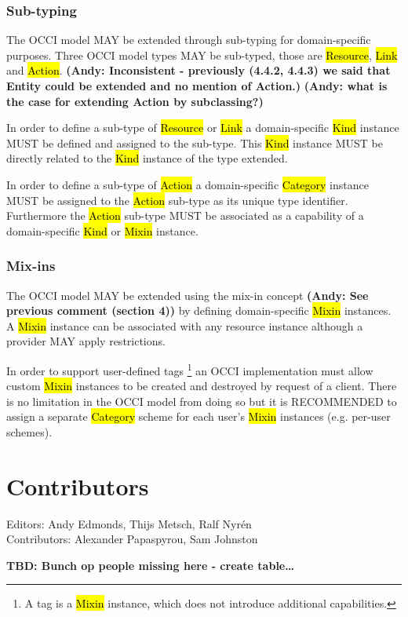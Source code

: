 \documentclass[10pt,a4paper]{article}
\begin{document}
\subsubsection{Sub-typing}
The OCCI model MAY be extended through sub-typing for domain-specific purposes.
Three OCCI model types MAY be sub-typed, those are \hl{Resource}, \hl{Link} and
\hl{Action}. \textbf{(Andy: Inconsistent - previously (4.4.2, 4.4.3) we said that Entity 
could be extended and no mention of Action.)} 
\textbf{(Andy: what is the case for extending Action by subclassing?)}

In order to define a sub-type of \hl{Resource} or \hl{Link} a domain-specific
\hl{Kind} instance MUST be defined and assigned to the sub-type. This
\hl{Kind} instance MUST be directly related to the \hl{Kind} instance of the
type extended.

In order to define a sub-type of \hl{Action} a domain-specific \hl{Category}
instance MUST be assigned to the \hl{Action} sub-type as its unique type identifier.
Furthermore the \hl{Action} sub-type MUST be associated as a capability of a
domain-specific \hl{Kind} or \hl{Mixin} instance.

\subsubsection{Mix-ins}
The OCCI model MAY be extended using the mix-in concept \textbf{(Andy: See previous comment (section 4))} by defining
domain-specific \hl{Mixin} instances.  A \hl{Mixin} instance can be associated
with any resource instance although a provider MAY apply restrictions.

In order to support user-defined tags \footnote{A tag is a \hl{Mixin} instance, 
which does not introduce additional capabilities.} an OCCI implementation must allow custom
\hl{Mixin} instances to be created and destroyed by request of a client.
There is no limitation in the OCCI model from doing so but it is RECOMMENDED to
assign a separate \hl{Category} scheme for each user's \hl{Mixin} instances (e.g. per-user schemes).

\section{Contributors}
Editors: Andy Edmonds, Thijs Metsch, Ralf Nyrén \\
Contributors: Alexander Papaspyrou, Sam Johnston

\textbf{TBD: Bunch op people missing here - create table\ldots}
\end{document}
